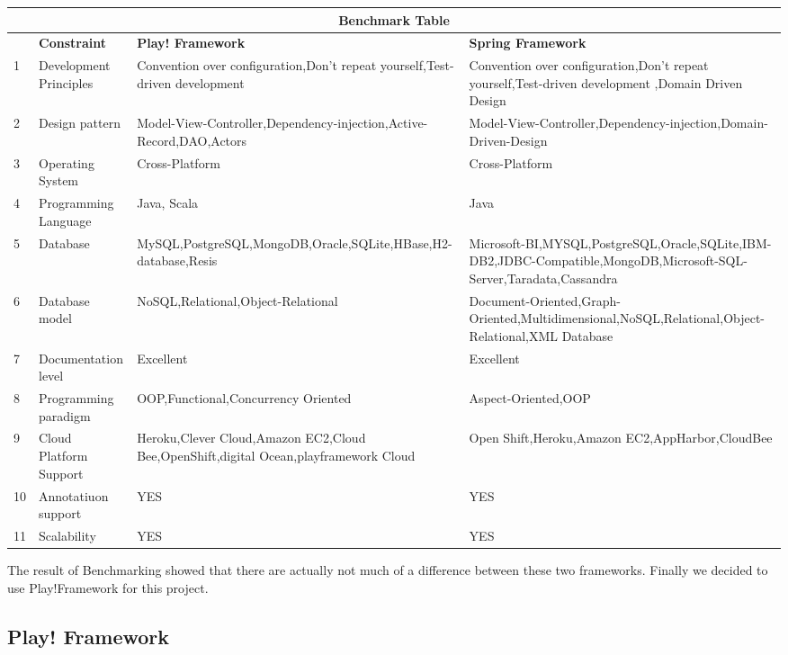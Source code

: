 \begin{center}
	

\begin{tabular}{ |l||l|p{7cm}|p{6cm}|  }
 \hline
 \multicolumn{4}{|c|}{\textbf{Benchmark Table}} \\
 \hline
 ~ & \textbf{Constraint} & \textbf{Play! Framework} & \textbf{Spring Framework}\\
 \hline
 1   & Development Principles & Convention over configuration,Don't repeat yourself,Test-driven development & Convention over configuration,Don't repeat yourself,Test-driven development ,Domain Driven Design   \\
 \hline
 2 & Design pattern & Model-View-Controller,Dependency-injection,Active-Record,DAO,Actors & Model-View-Controller,Dependency-injection,Domain-Driven-Design \\
 \hline
 3 &Operating System & Cross-Platform&  Cross-Platform\\
 \hline
 4 &Programming Language & Java, Scala &  Java\\
 \hline
 5& Database  & MySQL,PostgreSQL,MongoDB,Oracle,SQLite,HBase,H2-database,Resis& Microsoft-BI,MYSQL,PostgreSQL,Oracle,SQLite,IBM-DB2,JDBC-Compatible,MongoDB,Microsoft-SQL-Server,Taradata,Cassandra\\
 \hline
 6&   Database model  & NoSQL,Relational,Object-Relational & Document-Oriented,Graph-Oriented,Multidimensional,NoSQL,Relational,Object-Relational,XML Database\\
 \hline
 7&   Documentation level & Excellent&Excellent\\
 \hline
 8&   Programming paradigm  & OOP,Functional,Concurrency Oriented&Aspect-Oriented,OOP\\
 \hline
 9&   Cloud Platform Support  & Heroku,Clever Cloud,Amazon EC2,Cloud Bee,OpenShift,digital Ocean,playframework Cloud & Open Shift,Heroku,Amazon EC2,AppHarbor,CloudBee\\
 \hline
 10&   Annotatiuon support & YES & YES\\
 \hline
 11&   Scalability & YES&YES\\
 \hline
\end{tabular}
\end{center}

The result of Benchmarking showed that there are actually not much of a difference between these two frameworks. Finally we decided to use Play!Framework for this project.

\subsection{Play! Framework}
  



